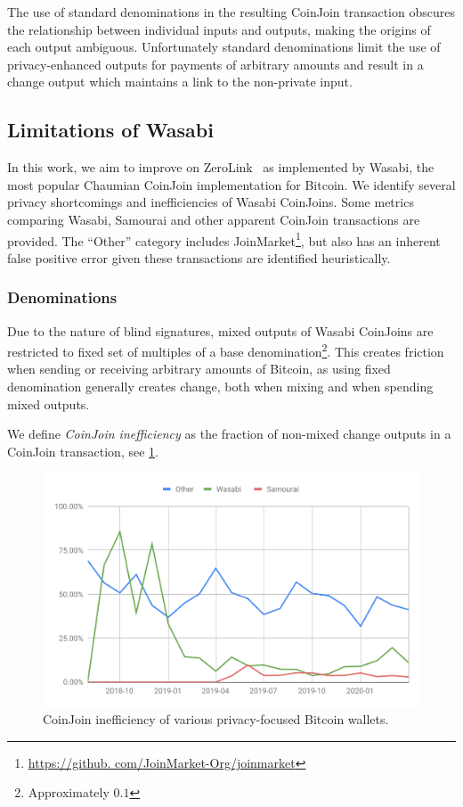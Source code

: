 \documentclass[a4paper]{article}
\def\bitcoinA{%
  \leavevmode
  \vtop{\offinterlineskip %
    \setbox0=\hbox{B}%
    \setbox2=\hbox to\wd0{\hfil\hskip-.03em
    \vrule height .3ex width .15ex\hskip .08em
    \vrule height .3ex width .15ex\hfil}
    \vbox{\copy2\box0}\box2}}
\begin{document}
The use of standard denominations in the resulting CoinJoin transaction obscures the relationship between individual inputs and outputs, making the origins of each output ambiguous. Unfortunately standard denominations limit the use of privacy-enhanced outputs for payments of arbitrary amounts and result in a change output which maintains a link to the non-private input.

\subsection{Limitations of Wasabi}\label{sec:limitations}
In this work, we aim to improve on ZeroLink~\cite{zerolink} as implemented by Wasabi, the most popular Chaumian CoinJoin implementation for Bitcoin. We identify several privacy shortcomings and inefficiencies of Wasabi CoinJoins. Some metrics comparing Wasabi, Samourai and other apparent CoinJoin transactions are provided. The ``Other'' category includes JoinMarket\footnote{\url{https://github. com/JoinMarket-Org/joinmarket}}, but also has an inherent false positive error given these transactions are identified heuristically.

\subsubsection{Denominations}

Due to the nature of blind signatures, mixed outputs of Wasabi CoinJoins are restricted to fixed set of multiples of a base denomination\footnote{Approximately $0.1$\bitcoinA{}}. This creates friction when sending or receiving arbitrary amounts of Bitcoin, as using fixed denomination generally creates change, both when mixing and when spending mixed outputs.

We define \emph{CoinJoin inefficiency} as the fraction of non-mixed change outputs in a CoinJoin transaction, see \cref{fig:cjinefficiency}.

\begin{figure}[h!]
    \centering
    \includegraphics[scale=0.4]{Figures/CJInefficiency.pdf}
    \caption{CoinJoin inefficiency of various privacy-focused Bitcoin wallets.}
    \label{fig:cjinefficiency}
\end{figure}
\end{document}
